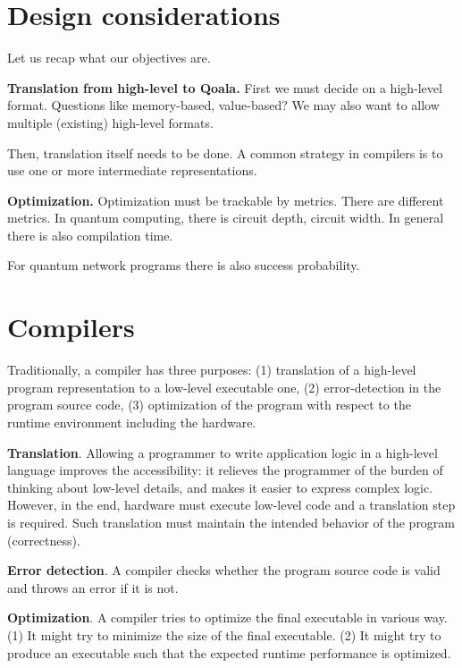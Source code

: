 

\section{Design considerations}
Let us recap what our objectives are.

\textbf{Translation from high-level to Qoala.}
First we must decide on a high-level format.
Questions like memory-based, value-based?
We may also want to allow multiple (existing) high-level formats.

Then, translation itself needs to be done. 
A common strategy in compilers is to use one or more intermediate representations.

\textbf{Optimization.}
Optimization must be trackable  by metrics.
There are different metrics.
In quantum computing, there is circuit depth, circuit width.
In general there is also compilation time.

For quantum network programs there is also success probability.


\section{Compilers}
Traditionally, a compiler has three purposes:
(1) translation of a high-level program representation to a low-level executable one,
(2) error-detection in the program source code,
(3) optimization of the program with respect to the runtime environment including the hardware.

\textbf{Translation}. Allowing a programmer to write application logic in a high-level language improves the accessibility: it relieves the programmer of the burden of thinking about low-level details, and makes it easier to express complex logic. However, in the end, hardware must execute low-level code and a translation step is required. Such translation must maintain the intended behavior of the program (correctness).

\textbf{Error detection}. A compiler checks whether the program source code is valid and throws an error if it is not.

\textbf{Optimization}. A compiler tries to optimize the final executable in various way. (1) It might try to minimize the size of the final executable. (2) It might try to produce an executable such that the expected runtime performance is optimized.

